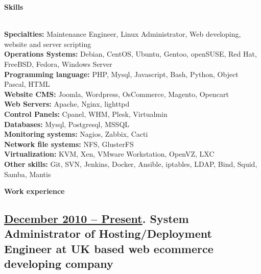 \documentclass[letterpaper]{article}
\renewcommand{\section}[1]{
  {
    \large \colorbox{my-gray}{
      \begin{minipage}
        {\textwidth-0.175in}
        {\textbf{#1 \vphantom{p\^{E}}}}
      \end{minipage}
    }
  }
}
\begin{document}
\section{Skills}
\label{sec-1}\\
\label{sec-1-1}
\textbf{Specialties:} Maintenance Engineer, Linux Administrator, Web developing, website and server scripting\\
\label{sec-1-2}
\textbf{Operations Systems:} Debian, CentOS, Ubuntu, Gentoo, openSUSE, Red Hat, FreeBSD, Fedora, Windows Server\\
\label{sec-1-3}
\textbf{Programming language:} PHP, Mysql, Javascript, Bash, Python, Object Pascal, HTML\\
\label{sec-1-4}
\textbf{Website CMS:} Joomla, Wordpress, OsCommerce, Magento, Opencart\\
\label{sec-1-5}
\textbf{Web Servers:} Apache, Nginx, lighttpd\\
\label{sec-1-6}
\textbf{Control Panels:} Cpanel, WHM, Plesk, Virtualmin\\
\label{sec-1-7}
\textbf{Databases:} Mysql, Postgresql, MSSQL\\
\label{sec-1-8}
\textbf{Monitoring systems:} Nagios, Zabbix, Cacti\\
\label{sec-1-9}
\textbf{Network file systems:} NFS, GlusterFS\\
\label{sec-1-10}
\textbf{Virtualization:} KVM, Xen, VMware Workstation, OpenVZ, LXC\\
\label{sec-1-11}
\textbf{Other skills:} Git, SVN, Jenkins, Docker, Ansible, iptables, LDAP, Bind, Squid, Samba, Mantis\\
\section{Work experience}
\label{sec-2}
\subsection{\ul{December 2010 – Present}. System Administrator of Hosting/Deployment Engineer at UK based web ecommerce developing company}
\label{sec-2-1}
\end{document}

